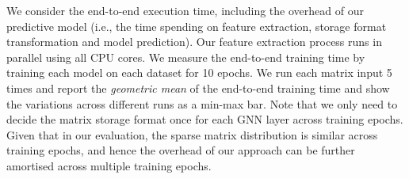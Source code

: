  We consider the end-to-end execution time, including the overhead of our predictive model (i.e., the time
spending on feature extraction, storage format transformation and model prediction). Our feature extraction process runs in parallel using
all CPU cores.   We measure the end-to-end training time by training each model on each dataset for 10 epochs. We run each matrix input 5
times and report the \emph{geometric mean} of the end-to-end training time and show the variations across different runs as a min-max bar.
Note that we only need to decide the matrix storage format once for each GNN layer across training epochs. Given that in our
evaluation, the sparse matrix distribution is similar across training epochs, and hence the overhead of our approach can be further
amortised across multiple training epochs.
